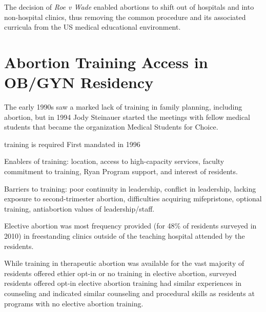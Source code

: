 \documentclass[letterpaper, 12pt]{article}
\begin{document}
The decision of \textit{Roe v Wade} enabled abortions to shift out of hospitals and into non-hospital clinics, thus removing the common procedure and its associated curricula from the US medical educational environment. \autocite[pg. 404]{aksel_unintended_2013}

\section*{Abortion Training Access in OB/GYN Residency}

The early 1990s saw a marked lack of training in family planning, including abortion, but in 1994 Jody Steinauer started the meetings with fellow medical students that became the organization Medical Students for Choice. \autocite[pg. 404-5]{aksel_unintended_2013}

training is required \autocite[IV.A.6.d, pg. 17]{accreditation_council_for_graduate_medical_education_acgme_2014}
First mandated in 1996 \autocite[pg. 146]{freedman_obstacles_2010}

Enablers of training: location, access to high-capacity services, faculty commitment to training, Ryan Program support, and interest of residents. \autocite[pg. 240-2]{guiahi_enablers_2013}

Barriers to training: poor continuity in leadership, conflict in leadership, lacking exposure to second-trimester abortion, difficulties acquiring mifepristone, optional training, antiabortion values of leadership/staff. \autocite[pg. 242]{guiahi_enablers_2013}

Elective abortion was most frequency provided (for 48\% of residents surveyed in 2010) in freestanding clinics outside of the teaching hospital attended by the residents. \autocite[pg. 274]{turk_availability_2014}

While training in therapeutic abortion was available for the vast majority of residents offered ethier opt-in or no training in elective abortion, surveyed residents offered opt-in elective abortion training had similar experiences in counseling and indicated similar counseling and procedural skills as residents at programs with no elective abortion training. \autocite[pg 275-6]{turk_availability_2014}


\end{document}
